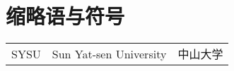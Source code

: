 

\chapter*{缩略语与符号}

\begin{longtable}
{p{0.5in}p{2.8in}p{2in}}
    SYSU  & Sun Yat-sen University & 中山大学\\
\end{longtable}

